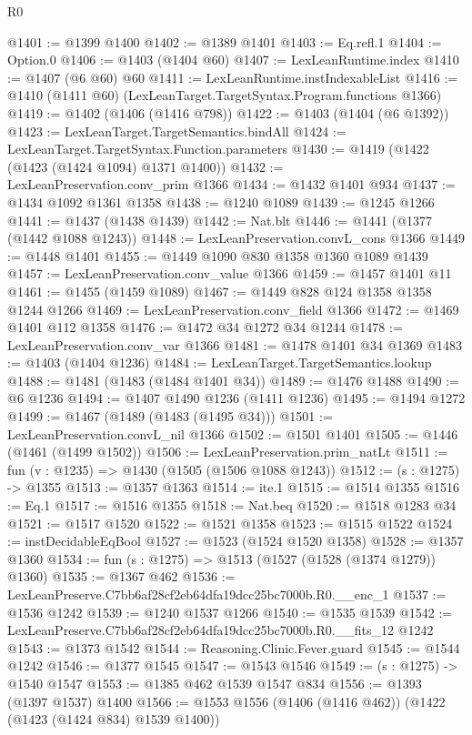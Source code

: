 \begin{lexlean}{R0}
\begin{coremodule}
@1401 := @1399 @1400
@1402 := @1389 @1401
@1403 := Eq.refl.{1}
@1404 := Option.{0}
@1406 := @1403 (@1404 @60)
@1407 := LexLeanRuntime.index
@1410 := @1407 (@6 @60) @60
@1411 := LexLeanRuntime.instIndexableList
@1416 := @1410 (@1411 @60) (LexLeanTarget.TargetSyntax.Program.functions @1366)
@1419 := @1402 (@1406 (@1416 @798))
@1422 := @1403 (@1404 (@6 @1392))
@1423 := LexLeanTarget.TargetSemantics.bindAll
@1424 := LexLeanTarget.TargetSyntax.Function.parameters
@1430 := @1419 (@1422 (@1423 (@1424 @1094) @1371 @1400))
@1432 := LexLeanPreservation.conv_prim @1366
@1434 := @1432 @1401 @934
@1437 := @1434 @1092 @1361 @1358
@1438 := @1240 @1089
@1439 := @1245 @1266
@1441 := @1437 (@1438 @1439)
@1442 := Nat.blt
@1446 := @1441 (@1377 (@1442 @1088 @1243))
@1448 := LexLeanPreservation.convL_cons @1366
@1449 := @1448 @1401
@1455 := @1449 @1090 @830 @1358 @1360 @1089 @1439
@1457 := LexLeanPreservation.conv_value @1366
@1459 := @1457 @1401 @11
@1461 := @1455 (@1459 @1089)
@1467 := @1449 @828 @124 @1358 @1358 @1244 @1266
@1469 := LexLeanPreservation.conv_field @1366
@1472 := @1469 @1401 @112 @1358
@1476 := @1472 @34 @1272 @34 @1244
@1478 := LexLeanPreservation.conv_var @1366
@1481 := @1478 @1401 @34 @1369
@1483 := @1403 (@1404 @1236)
@1484 := LexLeanTarget.TargetSemantics.lookup
@1488 := @1481 (@1483 (@1484 @1401 @34))
@1489 := @1476 @1488
@1490 := @6 @1236
@1494 := @1407 @1490 @1236 (@1411 @1236)
@1495 := @1494 @1272
@1499 := @1467 (@1489 (@1483 (@1495 @34)))
@1501 := LexLeanPreservation.convL_nil @1366
@1502 := @1501 @1401
@1505 := @1446 (@1461 (@1499 @1502))
@1506 := LexLeanPreservation.prim_natLt
@1511 := fun (v : @1235) => @1430 (@1505 (@1506 @1088 @1243))
@1512 := (s : @1275) -> @1355
@1513 := @1357 @1363
@1514 := ite.{1}
@1515 := @1514 @1355
@1516 := Eq.{1}
@1517 := @1516 @1355
@1518 := Nat.beq
@1520 := @1518 @1283 @34
@1521 := @1517 @1520
@1522 := @1521 @1358
@1523 := @1515 @1522
@1524 := instDecidableEqBool
@1527 := @1523 (@1524 @1520 @1358)
@1528 := @1357 @1360
@1534 := fun (s : @1275) => @1513 (@1527 (@1528 (@1374 @1279)) @1360)
@1535 := @1367 @462
@1536 := LexLeanPreserve.C7bb6af28cf2eb64dfa19dcc25bc7000b.R0.__enc_1
@1537 := @1536 @1242
@1539 := @1240 @1537 @1266
@1540 := @1535 @1539
@1542 := LexLeanPreserve.C7bb6af28cf2eb64dfa19dcc25bc7000b.R0.__fits_12 @1242
@1543 := @1373 @1542
@1544 := Reasoning.Clinic.Fever.guard
@1545 := @1544 @1242
@1546 := @1377 @1545
@1547 := @1543 @1546
@1549 := (s : @1275) -> @1540 @1547
@1553 := @1385 @462 @1539 @1547 @834
@1556 := @1393 (@1397 @1537) @1400
@1566 := @1553 @1556 (@1406 (@1416 @462)) (@1422 (@1423 (@1424 @834) @1539 @1400))

\end{coremodule}
\end{lexlean}
